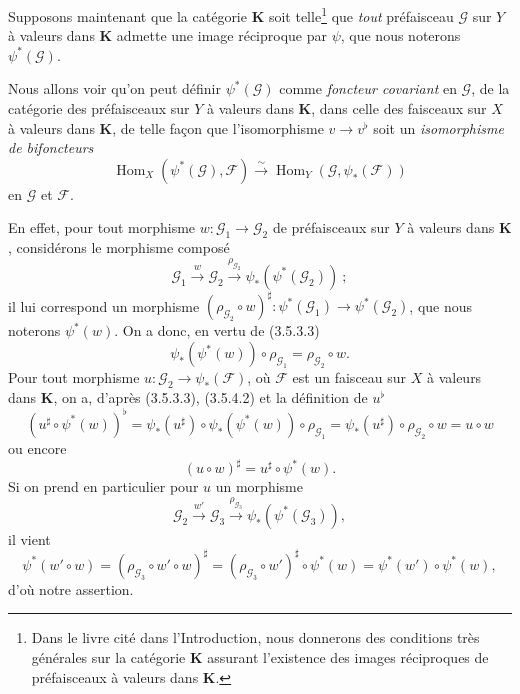 
\begin{env}[3.5.4]
\label{0.3.5.4-fr}
Supposons maintenant que la catégorie $\boldsymbol{K}$ soit telle\footnote{Dans
le livre cité dans l'Introduction, nous donnerons des conditions très
générales sur la catégorie $\boldsymbol{K}$ assurant l'existence des images
réciproques de préfaisceaux à valeurs dans $\boldsymbol{K}$.} que \emph{tout}
préfaisceau $\mathcal{G}$ sur $Y$ à valeurs dans $\boldsymbol{K}$ admette une
image réciproque par $\psi$, que nous noterons $\psi^*(\mathcal{G})$.

Nous allons voir qu'on peut définir $\psi^*(\mathcal{G})$ comme \emph{foncteur
covariant} en $\mathcal{G}$, de la catégorie des préfaisceaux sur $Y$ à
valeurs dans $\boldsymbol{K}$, dans celle des faisceaux sur $X$ à valeurs dans
$\boldsymbol{K}$, de telle façon que l'isomorphisme $v\to v^\flat$ soit un
\emph{isomorphisme de bifoncteurs}
\begin{equation*}
  \operatorname{Hom}_X(\psi^*(\mathcal{G}),\mathcal{F})
  \xrightarrow{\sim}
  \operatorname{Hom}_Y(\mathcal{G},\psi_*(\mathcal{F}))
\tag{3.5.4.1}\label{0.3.5.4.1-fr}
\end{equation*}
en $\mathcal{G}$ et $\mathcal{F}$.

En effet, pour tout morphisme
$w:\mathcal{G}_1\to\mathcal{G}_2$ de préfaisceaux sur $Y$ à valeurs dans
$\boldsymbol{K}$, considérons le morphisme composé
\[
  \mathcal{G}_1\xrightarrow{w}\mathcal{G}_2
  \xrightarrow{\rho_{\mathcal{G}_2}}
  \psi_*(\psi^*(\mathcal{G}_2))~;
\]
il lui correspond un morphisme
$(\rho_{\mathcal{G}_2}\circ w)^\sharp:
\psi^*(\mathcal{G}_1)\to\psi^*(\mathcal{G}_2)$, que nous noterons
$\psi^*(w)$. On a donc, en vertu de (3.5.3.3)
\begin{equation*}
  \psi_*(\psi^*(w))\circ\rho_{\mathcal{G}_1}
  =\rho_{\mathcal{G}_2}\circ w.
\tag{3.5.4.2}\label{0.3.5.4.2-fr}
\end{equation*}
Pour tout morphisme $u:\mathcal{G}_2\to\psi_*(\mathcal{F})$, où
$\mathcal{F}$ est un faisceau sur $X$ à valeurs dans $\boldsymbol{K}$, on a,
d'après (3.5.3.3), (3.5.4.2) et la définition de $u^\flat$
\[
  (u^\sharp\circ\psi^*(w))^\flat
  =\psi_*(u^\sharp)\circ\psi_*(\psi^*(w))\circ\rho_{\mathcal{G}_1}
  =\psi_*(u^\sharp)\circ\rho_{\mathcal{G}_2}\circ w
  =u\circ w
\]
ou encore
\begin{equation*}
  (u\circ w)^\sharp=u^\sharp\circ\psi^*(w).
\tag{3.5.4.3}\label{0.3.5.4.3-fr}
\end{equation*}
Si on prend en particulier pour $u$ un morphisme
\[
  \mathcal{G}_2\xrightarrow{w'}\mathcal{G}_3
  \xrightarrow{\rho_{\mathcal{G}_3}}
  \psi_*(\psi^*(\mathcal{G}_3)),
\]
il vient
\[
  \psi^*(w'\circ w)
  =(\rho_{\mathcal{G}_3}\circ w'\circ w)^\sharp
  =(\rho_{\mathcal{G}_3}\circ w')^\sharp\circ\psi^*(w)
  =\psi^*(w')\circ\psi^*(w),
\]
d'où notre assertion.


\end{env}
